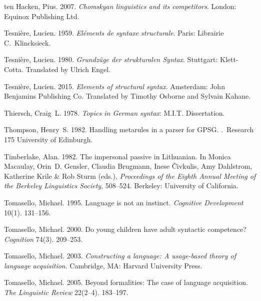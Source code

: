 \begin{thebibliography}{1420}
{ten Hacken}, Pius. 2007.
\newblock \emph{Chomskyan linguistics and its competitors}.
\newblock London: Equinox Publishing Ltd.

Tesni{\`e}re, Lucien. 1959.
\newblock \emph{El{\'e}ments de syntaxe structurale}.
\newblock Paris: Librairie C.\ Klincksieck.

Tesni{\`e}re, Lucien. 1980.
\newblock \emph{{Grundz{\"u}ge der strukturalen Syntax}}.
\newblock Stuttgart: Klett-Cotta.
\newblock Translated by Ulrich Engel.

Tesni{\`e}re, Lucien. 2015.
\newblock \emph{Elements of structural syntax}.
\newblock Amsterdam: John Benjamins Publishing Co.
\newblock Translated by Timothy Osborne and Sylvain Kahane.

Thiersch, Craig~L. 1978.
\newblock \emph{Topics in {German} syntax}: M.I.T. Dissertation.

Thompson, Henry~S. 1982.
\newblock Handling metarules in a parser for {GPSG}.
.\ Research 175 University of Edinburgh.

Timberlake, Alan. 1982.
\newblock The impersonal passive in {Lithuanian}.
\newblock In Monica Macaulay, Orin~D. Gensler, Claudia Brugmann, Inese {\v
  C}ivkulis, Amy Dahlstrom, Katherine Krile \& Rob Sturm (eds.),
  \emph{Proceedings of the {Eighth Annual Meeting of the Berkeley Linguistics
  Society}}, 508--524. Berkeley: University of California.

Tomasello, Michael. 1995.
\newblock Language is not an instinct.
\newblock \emph{Cognitive Development} 10(1). 131--156.

Tomasello, Michael. 2000.
\newblock Do young children have adult syntactic competence?
\newblock \emph{Cognition} 74(3). 209--253.

Tomasello, Michael. 2003.
\newblock \emph{Constructing a language: {A} usage-based theory of language
  acquisition}.
\newblock Cambridge, MA: Harvard University Press.

Tomasello, Michael. 2005.
\newblock Beyond formalities: {The} case of language acquisition.
\newblock \emph{The Linguistic Review} 22(2--4). 183--197.


\end{thebibliography}
